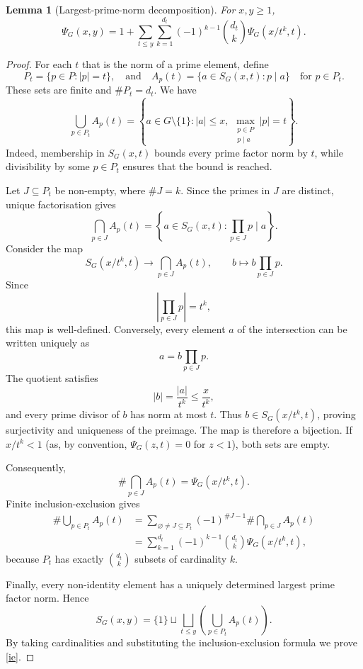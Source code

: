 \documentclass[10pt,a4paper]{amsart}
\newtheorem{lemma}[theorem]{Lemma}
\begin{document}
\begin{lemma}[Largest-prime-norm decomposition]\label{lem:ie}
For $x,y\ge1$,
\begin{equation}\label{ie}
\Psi_G(x,y)
=
1+\sum_{t\le y}\sum_{k=1}^{d_t}
(-1)^{k-1}\binom{d_t}{k}\Psi_G(x/t^k,t).
\end{equation}
\end{lemma}

\begin{proof}
For each $t$ that is the norm of a prime element, define
\[
P_t=\{p\in P:|p|=t\},
\quad \text{and} \quad 
A_p(t)=\{a\in S_G(x,t):p\mid a\}
\quad \text{for}\,\, p\in P_t.
\]
These sets are finite and $\#P_t=d_t$. We have
\[
\bigcup_{p\in P_t}A_p(t)
=
\left\{
a\in G\setminus\{1\}:|a|\le x,\ 
\max_{\substack{p\in P\\p\mid a}}|p|=t
\right\}.
\]
Indeed, membership in $S_G(x,t)$ bounds every prime factor
norm by $t$, while divisibility by some $p\in P_t$ ensures
that the bound is reached.

Let $J\subseteq P_t$ be non-empty, where $\#J=k$.
Since the primes in $J$ are distinct, unique factorisation
gives
\[
\bigcap_{p\in J}A_p(t)
=
\left\{
a\in S_G(x,t):
\prod_{p\in J}p\mid a
\right\}.
\]
Consider the map
\[
S_G(x/t^k,t)\longrightarrow\bigcap_{p\in J}A_p(t),
\qquad
b\longmapsto b\prod_{p\in J}p.
\]
Since
\[
\left|\prod_{p\in J}p\right|=t^k,
\]
this map is well-defined. Conversely, every element $a$
of the intersection can be written uniquely as
\[
a=b\prod_{p\in J}p.
\]
The quotient satisfies
\[
|b|=\frac{|a|}{t^k}\le\frac{x}{t^k},
\]
and every prime divisor of $b$ has norm at most $t$.
Thus $b\in S_G(x/t^k,t)$, proving surjectivity and
uniqueness of the preimage. The map is therefore a
bijection. If $x/t^k<1$ (as, by convention, $\Psi_G(z, t) = 0$ for $z < 1$), both sets are empty.

Consequently,
\[
\#\bigcap_{p\in J}A_p(t)=\Psi_G(x/t^k,t).
\]
Finite inclusion-exclusion gives
\begin{align*}
\#\bigcup_{p\in P_t}A_p(t)
&=
\sum_{\varnothing\ne J\subseteq P_t}
(-1)^{\#J-1}
\#\bigcap_{p\in J}A_p(t)\\
&=
\sum_{k=1}^{d_t}
(-1)^{k-1}\binom{d_t}{k}\Psi_G(x/t^k,t),
\end{align*}
because $P_t$ has exactly $\binom{d_t}{k}$ subsets
of cardinality $k$.

Finally, every non-identity element has a uniquely
determined largest prime factor norm. Hence
\[
S_G(x,y)
=
\{1\}\sqcup
\bigsqcup_{t\le y}
\left(\bigcup_{p\in P_t}A_p(t)\right).
\]
By taking cardinalities and substituting the
inclusion-exclusion formula we prove \eqref{ie}.
\end{proof}
\end{document}
